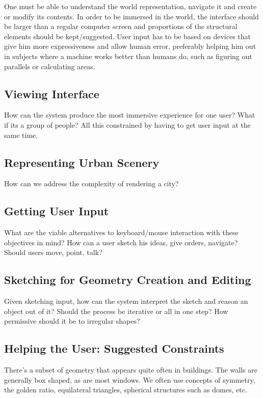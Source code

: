 One must be able to understand the world representation, navigate it and create or modify its contents.
In order to be immersed in the world, the interface should be larger than a regular computer screen
and proportions of the structural elements should be kept/suggested.
User input has to be based on devices that give him more expressiveness and allow human error,
preferably helping him out in subjects where a machine works better than humans do,
such as figuring out parallels or calculating areas.


\subsection{Viewing Interface}
How can the system produce the most immersive experience for one user?
What if its a group of people? All this constrained by having to get user input at the same time.

\subsection{Representing Urban Scenery}
How can we address the complexity of rendering a city?


\subsection{Getting User Input}
What are the viable alternatives to keyboard/mouse interaction with these objectives in mind?
How can a user sketch his ideas, give orders, navigate? Should users move, point, talk?


\subsection{Sketching for Geometry Creation and Editing}
Given sketching input, how can the system interpret the sketch and reason an object
out of it? Should the process be iterative or all in one step? How permissive should
it be to irregular shapes?
 

\subsection{Helping the User: Suggested Constraints}
There's a subset of geometry that appears quite often in buildings.
The walls are generally box shaped, as are most windows. We often use concepts of symmetry,
the golden ratio, equilateral triangles, spherical structures such as domes, etc.

